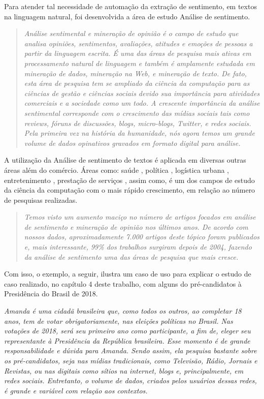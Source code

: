 Para atender tal necessidade de automação da extração de sentimento, em textos na linguagem natural, foi desenvolvida a área de estudo Análise de sentimento.

\blockquote{\textit{Análise sentimental e mineração de opinião é o campo de estudo que analisa opiniões, sentimentos, avaliações, atitudes e emoções de pessoas a partir da linguagem escrita. É uma das áreas de pesquisa mais ativas em processamento natural de linguagem e também é amplamente estudada em mineração de dados, mineração na Web, e mineração de texto. De fato, esta área de pesquisa tem se ampliado da ciência da computação para as ciências de gestão e ciências sociais devido sua importância para atividades comerciais e a sociedade como um todo. A crescente importância da análise sentimental corresponde com o crescimento das mídias sociais tais como reviews, fóruns de discussões, blogs, micro-blogs, Twitter, e redes sociais. Pela primeira vez na história da humanidade, nós agora temos um grande volume de dados opinativos gravados em formato digital para análise.} \cite[tradução do autor]{bingLiu:2012}}

A utilização da Análise de sentimento de textos é aplicada em diversas outras áreas além do comércio. Áreas como: saúde \cite{GaoEtAlInfluenza:18}, política \cite{MarozzoeBessi:18}, logística urbana \cite{GaoEtAl:17}, entretenimento \cite{Rosa:15}, prestação de serviços \cite{ThakoreSasi:15}, assim como, é um dos campos de estudo da ciência da computação com o mais rápido crescimento, em relação ao número de pesquisas realizadas.
\blockquote{\textit{Temos visto um aumento maciço no número de artigos focados em análise de sentimento e mineração de opinião nos últimos anos. De acordo com nossos dados, aproximadamente 7.000 artigos deste tópico foram publicados e, mais interessante, 99\% dos trabalhos surgiram depois de 2004, fazendo da análise de sentimento uma das áreas de pesquisa que mais cresce.}
\cite[tradução do autor]{MANTYLA201816}}

Com isso, o exemplo, a seguir, ilustra um caso de uso para explicar o estudo de caso realizado, no capítulo 4 deste trabalho, com alguns do pré-candidatos à Presidência do Brasil de 2018.

\textit{Amanda é uma cidadã brasileira que, como todos os outros, ao completar 18 anos, tem de votar obrigatoriamente, nas eleições políticas no Brasil. Nas votações de 2018, será seu primeiro ano como participante, a fim de, eleger seu representante à Presidência da República brasileira. Esse momento é de grande responsabilidade e dúvida para Amanda. Sendo assim, ela pesquisa bastante sobre os pré-candidatos, seja nas mídias tradicionais, como Televisão, Rádio, Jornais e Revistas, ou nas digitais como sítios na internet, blogs e, principalmente, em redes sociais. Entretanto, o volume de dados, criados pelos usuários dessas redes, é grande e variável com relação aos contextos.} 


